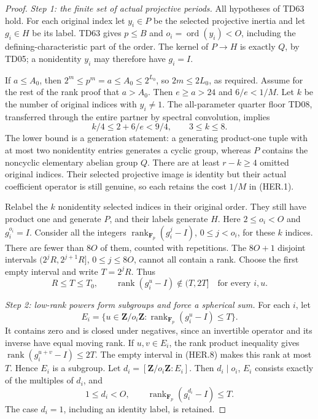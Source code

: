 \begin{proof}
\emph{Step 1: the finite set of actual projective periods.}
All hypotheses of TD63 hold.  For each original index let \(y_i\in P\)
be the selected projective inertia and let \(g_i\in H\) be its label.
TD63 gives \(p\le B\) and \(o_i=\operatorname{ord}(y_i)<O\), including
the defining-characteristic part of the order.
The kernel of \(P\to H\) is exactly \(Q\), by TD05; a nonidentity
\(y_i\) may therefore have \(g_i=I\).

If \(a\le A_0\), then \(2^m\le p^m=a\le A_0\le2^{L_0}\),
so \(2m\le2L_0\), as required.  Assume for the rest of the rank proof
that \(a>A_0\).  Then \(e\ge a>24\) and \(6/e<1/M\).
Let \(k\) be the number of original indices with \(y_i\ne1\).
The all-parameter quarter floor TD08, transferred through the entire
partner by spectral convolution, implies
\[
       k/4\le 2+6/e<9/4,\qquad 3\le k\le8.
 \tag{HER.7}
\]
The lower bound is a generation statement: a generating product-one
tuple with at most two nonidentity entries generates a cyclic group,
whereas \(P\) contains the noncyclic elementary abelian group \(Q\).
There are at least \(r-k\ge4\) omitted original indices.  Their selected
projective image is identity but their actual coefficient operator is
still genuine, so each retains the cost \(1/M\) in (HER.1).

Relabel the \(k\) nonidentity selected indices in their original order.
They still have product one and generate \(P\), and their labels
generate \(H\).  Here \(2\le o_i<O\) and \(g_i^{o_i}=I\).
Consider all the integers
\(\operatorname{rank}_{\mathbf F_p}(g_i^j-I)\),
\(0\le j<o_i\), for these \(k\) indices.  There are fewer than \(8O\)
of them, counted with repetitions.  The \(8O+1\) disjoint intervals
\((2^jR,2^{j+1}R]\), \(0\le j\le8O\), cannot all contain a rank.
Choose the first empty interval and write \(T=2^jR\).  Thus
\[
 R\le T\le T_0,\qquad
 \operatorname{rank}(g_i^u-I)\notin(T,2T]
          \quad\text{for every }i,u.
 \tag{HER.8}
\]

\emph{Step 2: low-rank powers form subgroups and force a spherical sum.}
For each \(i\), let
\[
 E_i=\{u\in\mathbf Z/o_i\mathbf Z:
              \operatorname{rank}_{\mathbf F_p}(g_i^u-I)\le T\}.
 \tag{HER.9}
\]
It contains zero and is closed under negatives, since an invertible
operator and its inverse have equal moving rank.  If \(u,v\in E_i\),
the rank product inequality gives
\(\operatorname{rank}(g_i^{u+v}-I)\le2T\).  The empty interval in
(HER.8) makes this rank at most \(T\).  Hence \(E_i\) is a subgroup.
Let \(d_i=[\mathbf Z/o_i\mathbf Z:E_i]\).  Then \(d_i\mid o_i\),
\(E_i\) consists exactly of the multiples of \(d_i\), and
\[
   1\le d_i<O,\qquad
   \operatorname{rank}_{\mathbf F_p}(g_i^{d_i}-I)\le T.
 \tag{HER.10}
\]
The case \(d_i=1\), including an identity label, is retained.


\end{proof}
